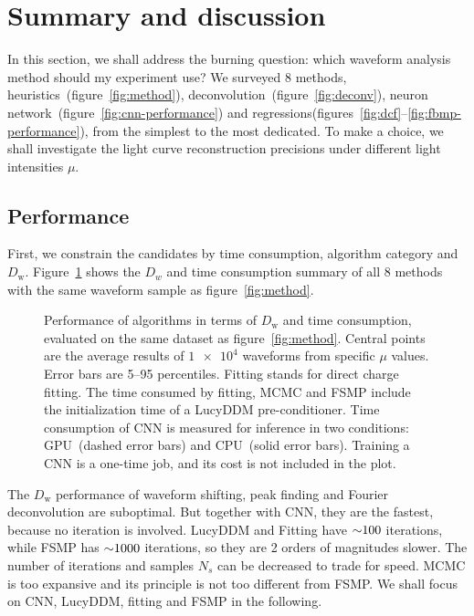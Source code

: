 \section{Summary and discussion}
\label{sec:discussion}

In this section, we shall address the burning question: which waveform analysis method should my experiment use?  We surveyed 8 methods, heuristics~(figure~\ref{fig:method}), deconvolution~(figure~\ref{fig:deconv}), neuron network~(figure~\ref{fig:cnn-performance}) and regressions(figures~\ref{fig:dcf}--\ref{fig:fbmp-performance}), from the simplest to the most dedicated.  To make a choice, we shall investigate the light curve reconstruction precisions under different light intensities $\mu$.

\subsection{Performance}

First, we constrain the candidates by time consumption, algorithm category and $D_\mathrm{w}$.  Figure~\ref{fig:chargesummary} shows the $D_w$ and time consumption summary of all 8 methods with the same waveform sample as figure~\ref{fig:method}.
\begin{figure}[H]
    \centering
    \resizebox{\textwidth}{!}{}
    \caption{\label{fig:chargesummary} Performance of algorithms in terms of $D_\mathrm{w}$ and time consumption, evaluated on the same dataset as figure~\ref{fig:method}. Central points are the average results of $\num[retain-unity-mantissa=false]{1e4}$ waveforms from specific $\mu$ values.  Error bars are 5--95 percentiles.  Fitting stands for direct charge fitting. The time consumed by fitting, MCMC and FSMP include the initialization time of a LucyDDM pre-conditioner.  Time consumption of CNN is measured for inference in two conditions: GPU\protect\footnotemark~(dashed error bars) and CPU\protect\footnotemark~(solid error bars).  Training a CNN is a one-time job, and its cost is not included in the plot.}
\end{figure}
\addtocounter{footnote}{-2}

The $D_\mathrm{w}$ performance of waveform shifting, peak finding and Fourier deconvolution are suboptimal.  But together with CNN, they are the fastest, because no iteration is involved.  LucyDDM and Fitting have $\num{\sim 100}$ iterations, while FSMP has $\num{\sim 1000}$ iterations, so they are 2 orders of magnitudes slower.  The number of iterations and samples $N_s$ can be decreased to trade for speed.  MCMC is too expansive and its principle is not too different from FSMP.  We shall focus on CNN, LucyDDM, fitting and FSMP in the following.

